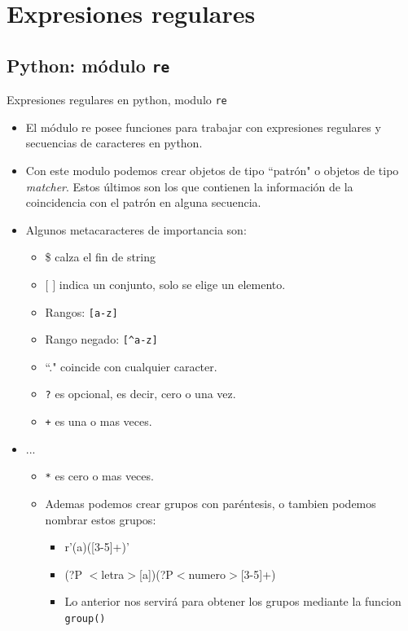\documentclass{beamer}
\begin{document}
\section{Expresiones regulares}
\subsection{Python: módulo \texttt{re}}

\begin{frame}[fragile]{Expresiones regulares en python, modulo \texttt{re}}
	\begin{itemize}
	\item El m\'odulo re posee funciones para trabajar con expresiones regulares y secuencias de caracteres en python.
    \item Con este modulo podemos crear objetos de tipo ``patrón" o objetos de tipo \emph{matcher}. Estos últimos son los que contienen la información de la coincidencia con el patrón en alguna secuencia.
    \item Algunos metacaracteres de importancia son:
    	\begin{itemize}
    	\item \$ calza el fin de string
        \item $[$ $]$ indica un conjunto, solo se elige un elemento.
        \item Rangos: \texttt{[a-z]}
        \item Rango negado: \texttt{[\textasciicircum a-z]}
        \item ``." coincide con cualquier caracter.
        \item \texttt{?} es opcional, es decir, cero o una vez.
        \item \texttt{+} es una o mas veces.
		\end{itemize}
    \end{itemize}
\end{frame}

\begin{frame}
		\begin{itemize}
        \item ...
          \begin{itemize}
          \item \texttt{*} es cero o mas veces.
          \item Ademas podemos crear grupos con paréntesis, o tambien podemos nombrar estos grupos:
              \begin{itemize}
              \item r'(a)([3-5]+)'
              \item (?P $<$letra$>$[a])(?P$<$numero$>$[3-5]+)
              \item Lo anterior nos servirá para obtener los grupos mediante la funcion \texttt{group()}
              \end{itemize}
          \end{itemize}
          \end{itemize}
\end{frame}
\end{document}
